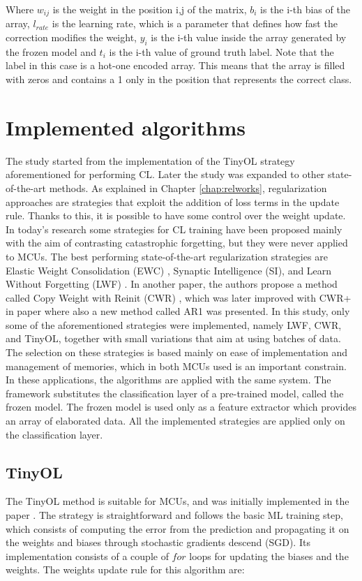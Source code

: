 \documentclass[12pt]{report}
\begin{document}
Where $w_{ij}$ is the weight in the position i,j of the matrix, $b_i$ is the i-th bias of the array, $l_{rate}$ is the learning rate, which is a parameter that defines how fast the correction modifies the weight, $y_i$ is the i-th value inside the array generated by the frozen model and $t_i$ is the i-th value of ground truth label. Note that the label in this case is a hot-one encoded array. This means that the array is filled with zeros and contains a 1 only in the position that represents the correct class.

\section{Implemented algorithms}
\label{algorithms}
The study started from the implementation of the TinyOL strategy aforementioned for performing CL. Later the study was expanded to other state-of-the-art methods. As explained in Chapter \ref{chap:relworks}, regularization approaches are strategies that exploit the addition of loss terms in the update rule. Thanks to this, it is possible to have some control over the weight update. In today's research some strategies for CL training have been proposed mainly with the aim of contrasting catastrophic forgetting, but they were never applied to MCUs. The best performing state-of-the-art regularization strategies are Elastic Weight Consolidation (EWC) \cite{kirkpatrick2017overcoming}, Synaptic Intelligence (SI)\cite{zenke2017continual}, and Learn Without Forgetting (LWF) \cite{li2017learning}. In another paper, the authors propose a method called Copy Weight with Reinit (CWR) \cite{lomonaco2017core50}, which was later improved with CWR+ in paper \cite{maltoni2019continuous} where also a new method called AR1 was presented. In this study, only some of the aforementioned strategies were implemented, namely LWF, CWR, and TinyOL, together with small variations that aim at using batches of data. The selection on these strategies is based mainly on ease of implementation and management of memories, which in both MCUs used is an important constrain.\\
In these applications, the algorithms are applied with the same system. The framework substitutes the classification layer of a pre-trained model, called the frozen model. The frozen model is used only as a feature extractor which provides an array of elaborated data. All the implemented strategies are applied only on the classification layer.

\subsection{TinyOL}
The TinyOL method is suitable for MCUs, and was initially implemented in the paper \cite{ren2021tinyol}. The strategy is straightforward and follows the basic ML training step, which consists of computing the error from the prediction and propagating it on the weights and biases through stochastic gradients descend (SGD). Its implementation consists of a couple of $for$ loops for updating the biases and the weights. The weights update rule for this algorithm are:
\end{document}

